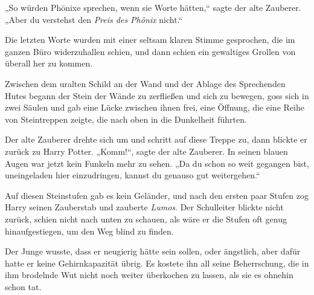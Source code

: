 „So würden Phönixe sprechen, wenn sie Worte hätten,“ sagte der alte Zauberer. „Aber du verstehst den \emph{Preis des Phönix} nicht.“

Die letzten Worte wurden mit einer seltsam klaren Stimme gesprochen, die im ganzen Büro widerzuhallen schien, und dann schien ein gewaltiges Grollen von überall her zu kommen.

Zwischen dem uralten Schild an der Wand und der Ablage des Sprechenden Hutes begann der Stein der Wände zu zerfließen und sich zu bewegen, goss sich in zwei Säulen und gab eine Lücke zwischen ihnen frei, eine Öffnung, die eine Reihe von Steintreppen zeigte, die nach oben in die Dunkelheit führten.

Der alte Zauberer drehte sich um und schritt auf diese Treppe zu, dann blickte er zurück zu Harry Potter. „Komm!“, sagte der alte Zauberer. In seinen blauen Augen war jetzt kein Funkeln mehr zu sehen. „Da du schon so weit gegangen bist, uneingeladen hier einzudringen, kannst du genauso gut weitergehen.“

\later

Auf diesen Steinstufen gab es kein Geländer, und nach den ersten paar Stufen zog Harry seinen Zauberstab und zauberte \emph{Lumos}. Der Schulleiter blickte nicht zurück, schien nicht nach unten zu schauen, als wäre er die Stufen oft genug hinaufgestiegen, um den Weg blind zu finden.

Der Junge wusste, dass er neugierig hätte sein sollen, oder ängstlich, aber dafür hatte er keine Gehirnkapazität übrig. Es kostete ihn all seine Beherrschung, die in ihm brodelnde Wut nicht noch weiter überkochen zu lassen, als sie es ohnehin schon tat.

